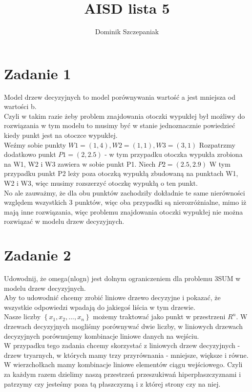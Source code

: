 \documentclass[12pt]{article}
\title{AISD lista 5}
\author{Dominik Szczepaniak}
\newcommand{\set}[1]{\left \{ #1 \right \}}				%
\begin{document}
\maketitle

\bgroup\obeylines

\section{Zadanie 1}
Model drzew decyzyjnych to model porównywania wartość a jest mniejsza od wartości b.\\

Czyli w takim razie żeby problem znajdowania otoczki wypukłej był możliwy do rozwiązania w tym modelu to musimy być w stanie jednoznacznie powiedzieć kiedy punkt jest na otoczce wypukłej.\\

Weźmy sobie punkty $W1 = (1, 4), W2 = (1, 1), W3 = (3, 1)$
Rozpatrzmy dodatkowo punkt $P1 = (2, 2.5)$ - w tym przypadku otoczka wypukła zrobiona na W1, W2 i W3 zawiera w sobie punkt P1.
Niech $P2 = (2.5, 2.9)$
W tym przypadku punkt P2 leży poza otoczką wypukłą zbudowaną na punktach W1, W2 i W3, więc musimy rozszerzyć otoczkę wypukłą o ten punkt. \\

No ale zauważmy, że dla obu punktów zachodziły dokładnie te same nierówności względem wszystkich 3 punktów, więc oba przypadki są nierozróżnialne, mimo iż mają inne rozwiązania, więc problemu znajdowania otoczki wypukłej nie można rozwiązać w modelu drzew decyzyjnych.

\section{Zadanie 2}
Udowodnij, że omega(nlogn) jest dolnym ograniczeniem dla problemu 3SUM w modelu drzew decyzyjnych.\\

Aby to udowodnić chcemy zrobić liniowe drzewo decyzyjne i pokazać, że wszystkie odpowiedzi wpadają do jakiegoś liścia w tym drzewie. \\

Nasze liczby $\set{x_1, x_2, ..., x_n}$ możemy traktować jako punkt w przestrzeni $R^n$.
W drzewach decyzyjnych mogliśmy porównywać dwie liczby, w liniowych drzewach decyzyjnych porównujemy kombinacje liniowe danych na wejściu. \\

W przypadku tego zadania chcemy skorzystać z liniowych drzew decyzyjnych - drzew tryarnych, w których mamy trzy przyrównania - mniejsze, większe i równe. W wierzchołkach mamy kombinacje liniowe elementów ciągu wejściowego. Czyli za każdym razem dzielimy naszą przestrzeń przeszukiwań hiperpłaszczyznami i patrzymy czy jesteśmy poza tą płaszczyzną i z której strony czy na niej. \\
\end{document}
